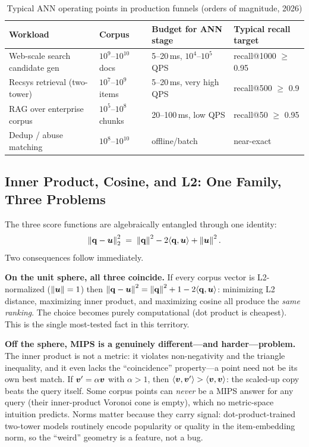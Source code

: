 \begin{table}[H]
\centering
\caption{Typical ANN operating points in production funnels (orders of magnitude, 2026)}
\label{sr:tab:operating_points}
\begin{tabularx}{\textwidth}{lXXX}
\toprule
\textbf{Workload} & \textbf{Corpus} & \textbf{Budget for ANN stage} & \textbf{Typical recall target} \\
\midrule
Web-scale search candidate gen & $10^9$--$10^{10}$ docs & 5--20\,ms, $10^4$--$10^5$ QPS & recall@1000 $\ge$ 0.95 \\
Recsys retrieval (two-tower) & $10^7$--$10^9$ items & 5--20\,ms, very high QPS & recall@500 $\ge$ 0.9 \\
RAG over enterprise corpus & $10^5$--$10^8$ chunks & 20--100\,ms, low QPS & recall@50 $\ge$ 0.95 \\
Dedup / abuse matching & $10^8$--$10^{10}$ & offline/batch & near-exact \\
\bottomrule
\end{tabularx}
\end{table}

\subsection{Inner Product, Cosine, and L2: One Family, Three Problems}

The three score functions are algebraically entangled through one identity:
\begin{equation}
\left\lVert\mathbf{q} - \bm{u}\right\rVert_2^2 \;=\; \left\lVert\mathbf{q}\right\rVert^2 - 2\langle\mathbf{q},\bm{u}\rangle + \left\lVert\bm{u}\right\rVert^2.
\label{sr:eq:l2_expansion}
\end{equation}
Two consequences follow immediately.

\textbf{On the unit sphere, all three coincide.} If every corpus vector is L2-normalized ($\left\lVert\bm{u}\right\rVert = 1$) then $\left\lVert\mathbf{q}-\bm{u}\right\rVert^2 = \left\lVert\mathbf{q}\right\rVert^2 + 1 - 2\langle\mathbf{q},\bm{u}\rangle$: minimizing L2 distance, maximizing inner product, and maximizing cosine all produce the \emph{same ranking}. The choice becomes purely computational (dot product is cheapest). This is the single most-tested fact in this territory.

\textbf{Off the sphere, MIPS is a genuinely different---and harder---problem.} The inner product is not a metric: it violates non-negativity and the triangle inequality, and it even lacks the ``coincidence'' property---a point need not be its own best match. If $\bm{v}' = \alpha\bm{v}$ with $\alpha > 1$, then $\langle\bm{v},\bm{v}'\rangle > \langle\bm{v},\bm{v}\rangle$: the scaled-up copy beats the query itself. Some corpus points can \emph{never} be a MIPS answer for any query (their inner-product Voronoi cone is empty), which no metric-space intuition predicts. Norms matter because they carry signal: dot-product-trained two-tower models routinely encode popularity or quality in the item-embedding norm, so the ``weird'' geometry is a feature, not a bug.

